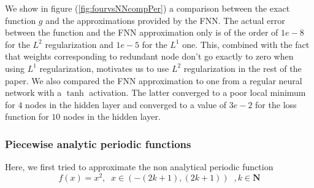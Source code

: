 \documentclass[AMS,STIX1COL]{WileyNJD-v2}
\begin{document}
We show in figure (\ref{fig:fourvsNNcompPer}) a comparison between the exact function $g$ and the approximations provided by the FNN. The actual error between the function and the FNN approximation only is of the order of $1e-8$ for the $L^2$ regularization and $1e-5$ for the $L^1$ one. This, combined with the fact that weights corresponding to redundant node don't go exactly to zero when using $L^1$ regularization, motivates us to use $L^2$ regularization in the rest of the paper. We also compared the FNN approximation to one from a regular neural network with a $\tanh$ activation. The latter converged to a poor local minimum for $4$ nodes in the hidden layer and converged to a value of $3e-2$ for the loss function for $10$ nodes in the hidden layer. 





\subsubsection{Piecewise analytic periodic functions}  
Here, we first tried to approximate the non analytical periodic function
\begin{equation}\label{Eq:xsquare}
  f(x) = x^2, \;\; \text{$x \in \left(-(2k+1), (2k+1)\right)$}\;\;, k \in \mathbf{N}  
\end{equation}
\end{document}

